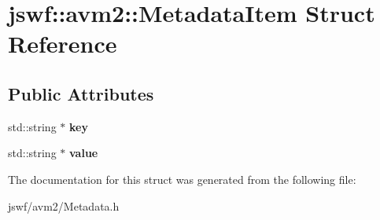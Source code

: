 \hypertarget{structjswf_1_1avm2_1_1_metadata_item}{\section{jswf\+:\+:avm2\+:\+:Metadata\+Item Struct Reference}
\label{structjswf_1_1avm2_1_1_metadata_item}
}
\subsection*{Public Attributes}
\begin{DoxyCompactItemize}
\item 
\hypertarget{structjswf_1_1avm2_1_1_metadata_item_a82d0ded36df062564eda6a6792d1706f}{std\+::string $\ast$ {\bfseries key}}\label{structjswf_1_1avm2_1_1_metadata_item_a82d0ded36df062564eda6a6792d1706f}

\item 
\hypertarget{structjswf_1_1avm2_1_1_metadata_item_ad9a45b5a286778db5701cfb9c0333a07}{std\+::string $\ast$ {\bfseries value}}\label{structjswf_1_1avm2_1_1_metadata_item_ad9a45b5a286778db5701cfb9c0333a07}

\end{DoxyCompactItemize}


The documentation for this struct was generated from the following file\+:\begin{DoxyCompactItemize}
\item 
jswf/avm2/Metadata.\+h\end{DoxyCompactItemize}
